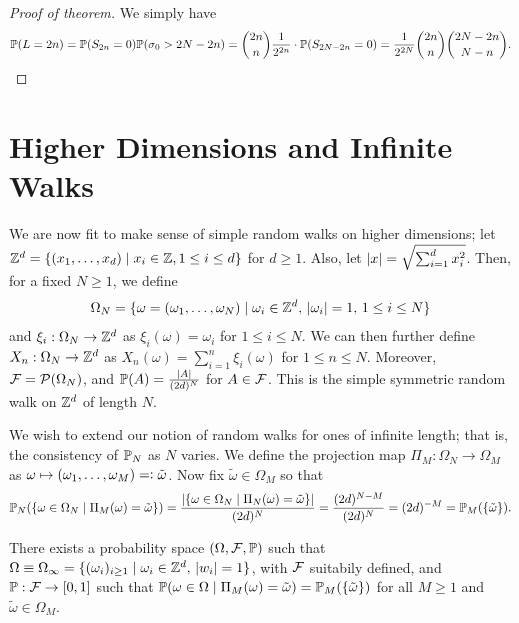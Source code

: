 \begin{proof}[Proof of theorem]
    We simply have
    \begin{align}
        \mathbb{P}(L = 2n) = \mathbb{P}(S_{2n}=0)\mathbb{P}(\sigma_{0} > 2N-2n) = \binom{2n}{n} \frac{1}{2^{2n}} \cdot \mathbb{P}(S_{2N-2n}=0) = \frac{1}{2^{2N}} \binom{2n}{n} \binom{2N-2n}{N-n}.
    \end{align}
\end{proof}

\section{Higher Dimensions and Infinite Walks}
We are now fit to make sense of simple random walks on higher dimensions; let $\mathbb{Z}^{d} = \{(x_{1},\ldots,x_{d}) \mid x_{i} \in \mathbb{Z}, 1 \leq i \leq d\}$ for $d \geq 1$. Also, let $\left| x \right| = \sqrt{\sum_{i=1}^{d} x_{i}^{2}}$. Then, for a fixed $N \geq 1$, we define
\begin{align}
    \Omega_{N} = \{\omega = (\omega_{1},\ldots,\omega_{N}) \mid \omega_{i} \in \mathbb{Z}^{d}, \, \left| \omega_{i} \right| = 1,\, 1 \leq i \leq N\}
\end{align}
and $\xi_{i}:\Omega_{N} \to \mathbb{Z}^{d}$ as $\xi_{i}(\omega) = \omega_{i}$ for $1 \leq i \leq N$. We can then further define $X_{n}:\Omega_{N} \to \mathbb{Z}^{d}$ as $X_{n}(\omega) = \sum_{i=1}^{n} \xi_{i}(\omega)$ for $1 \leq n \leq N$. Moreover, $\mathcal{F} = \mathcal{P}(\Omega_{N})$, and $\mathbb{P}(A) = \frac{\left| A \right|}{(2d)^{N}}$ for $A \in \mathcal{F}$. This is the simple symmetric random walk on $\mathbb{Z}^{d}$ of length $N$.

We wish to extend our notion of random walks for ones of infinite length; that is, the consistency of $\mathbb{P}_{N}$ as $N$ varies. We define the projection map $\Pi_{M}:\Omega_{N} \to \Omega_{M}$ as $\omega \mapsto (\omega_{1},\ldots,\omega_{M}) =\vcentcolon \tilde{\omega}$. Now fix $\tilde{\omega} \in \Omega_{M}$ so that
\begin{align}
    \mathbb{P}_{N}(\{\omega \in \Omega_{N} \mid \Pi_{M}(\omega) = \tilde{\omega}\}) = \frac{\left| \{\omega \in \Omega_{N} \mid \Pi_{N}(\omega) = \tilde{\omega}\} \right|}{(2d)^{N}} = \frac{(2d)^{N-M}}{(2d)^{N}} = (2d)^{-M} = \mathbb{P}_{M}(\{\tilde{\omega}\}).
\end{align}

\begin{theorem}
    There exists a probability space $(\Omega,\mathcal{F},\mathbb{P})$ such that $\Omega \equiv \Omega_{\infty} = \{(\omega_{i})_{i \geq 1} \mid \omega_{i} \in \mathbb{Z}^{d}, \, \left| w_{i} \right| = 1\}$, with $\mathcal{F}$ suitabily defined, and $\mathbb{P}:\mathcal{F} \to [0,1]$ such that $\mathbb{P}(\omega \in \Omega \mid \Pi_{M}(\omega) = \tilde{\omega}) = \mathbb{P}_{M}(\{\tilde{\omega}\})$ for all $M \geq 1$ and $\tilde{\omega} \in \Omega_{M}$.
\end{theorem}

